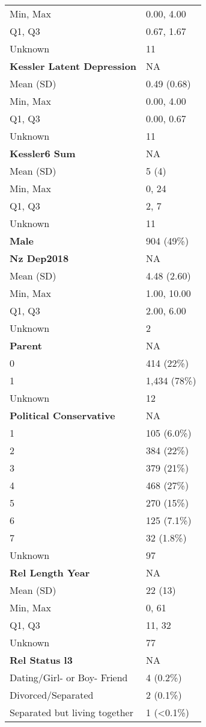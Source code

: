 \documentclass[
  single column]{article}
\begin{document}
\begin{longtable}[]{@{}ll@{}}
Min, Max & 0.00, 4.00 \\
Q1, Q3 & 0.67, 1.67 \\
Unknown & 11 \\
\textbf{Kessler Latent Depression} & NA \\
Mean (SD) & 0.49 (0.68) \\
Min, Max & 0.00, 4.00 \\
Q1, Q3 & 0.00, 0.67 \\
Unknown & 11 \\
\textbf{Kessler6 Sum} & NA \\
Mean (SD) & 5 (4) \\
Min, Max & 0, 24 \\
Q1, Q3 & 2, 7 \\
Unknown & 11 \\
\textbf{Male} & 904 (49\%) \\
\textbf{Nz Dep2018} & NA \\
Mean (SD) & 4.48 (2.60) \\
Min, Max & 1.00, 10.00 \\
Q1, Q3 & 2.00, 6.00 \\
Unknown & 2 \\
\textbf{Parent} & NA \\
0 & 414 (22\%) \\
1 & 1,434 (78\%) \\
Unknown & 12 \\
\textbf{Political Conservative} & NA \\
1 & 105 (6.0\%) \\
2 & 384 (22\%) \\
3 & 379 (21\%) \\
4 & 468 (27\%) \\
5 & 270 (15\%) \\
6 & 125 (7.1\%) \\
7 & 32 (1.8\%) \\
Unknown & 97 \\
\textbf{Rel Length Year} & NA \\
Mean (SD) & 22 (13) \\
Min, Max & 0, 61 \\
Q1, Q3 & 11, 32 \\
Unknown & 77 \\
\textbf{Rel Status l3} & NA \\
Dating/Girl- or Boy- Friend & 4 (0.2\%) \\
Divorced/Separated & 2 (0.1\%) \\
Separated but living together & 1 (\textless0.1\%) \\

\end{longtable}
\end{document}
